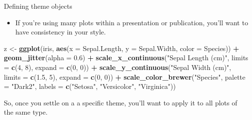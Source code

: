 \documentclass[
  ignorenonframetext,
]{beamer}
\newenvironment{Shaded}{\begin{snugshade}}{\end{snugshade}}
\newcommand{\AttributeTok}[1]{\textcolor[rgb]{0.13,0.29,0.53}{#1}}
\newcommand{\DecValTok}[1]{\textcolor[rgb]{0.00,0.00,0.81}{#1}}
\newcommand{\FloatTok}[1]{\textcolor[rgb]{0.00,0.00,0.81}{#1}}
\newcommand{\FunctionTok}[1]{\textcolor[rgb]{0.13,0.29,0.53}{\textbf{#1}}}
\newcommand{\NormalTok}[1]{#1}
\newcommand{\OtherTok}[1]{\textcolor[rgb]{0.56,0.35,0.01}{#1}}
\newcommand{\SpecialCharTok}[1]{\textcolor[rgb]{0.81,0.36,0.00}{\textbf{#1}}}
\newcommand{\StringTok}[1]{\textcolor[rgb]{0.31,0.60,0.02}{#1}}
\providecommand{\tightlist}{%
  \setlength{\itemsep}{0pt}\setlength{\parskip}{0pt}}
\begin{document}
\begin{frame}[fragile]{Defining theme objects}
\label{defining-theme-objects}
\begin{itemize}
\tightlist
\item
  If you're using many plots within a presentation or publication,
  you'll want to have consistency in your style.
\end{itemize}


\begin{Shaded}
\begin{Highlighting}[]
\NormalTok{z }\OtherTok{\textless{}{-}} \FunctionTok{ggplot}\NormalTok{(iris, }\FunctionTok{aes}\NormalTok{(}\AttributeTok{x =}\NormalTok{ Sepal.Length, }\AttributeTok{y =}\NormalTok{ Sepal.Width, }\AttributeTok{color =}\NormalTok{ Species)) }\SpecialCharTok{+}
    \FunctionTok{geom\_jitter}\NormalTok{(}\AttributeTok{alpha =} \FloatTok{0.6}\NormalTok{) }\SpecialCharTok{+} \FunctionTok{scale\_x\_continuous}\NormalTok{(}\StringTok{"Sepal Length (cm)"}\NormalTok{,}
    \AttributeTok{limits =} \FunctionTok{c}\NormalTok{(}\DecValTok{4}\NormalTok{, }\DecValTok{8}\NormalTok{), }\AttributeTok{expand =} \FunctionTok{c}\NormalTok{(}\DecValTok{0}\NormalTok{, }\DecValTok{0}\NormalTok{)) }\SpecialCharTok{+} \FunctionTok{scale\_y\_continuous}\NormalTok{(}\StringTok{"Sepal Width (cm)"}\NormalTok{,}
    \AttributeTok{limits =} \FunctionTok{c}\NormalTok{(}\FloatTok{1.5}\NormalTok{, }\DecValTok{5}\NormalTok{), }\AttributeTok{expand =} \FunctionTok{c}\NormalTok{(}\DecValTok{0}\NormalTok{, }\DecValTok{0}\NormalTok{)) }\SpecialCharTok{+} \FunctionTok{scale\_color\_brewer}\NormalTok{(}\StringTok{"Species"}\NormalTok{,}
    \AttributeTok{palette =} \StringTok{"Dark2"}\NormalTok{, }\AttributeTok{labels =} \FunctionTok{c}\NormalTok{(}\StringTok{"Setosa"}\NormalTok{, }\StringTok{"Versicolor"}\NormalTok{, }\StringTok{"Virginica"}\NormalTok{))}
\end{Highlighting}
\end{Shaded}

So, once you settle on a a specific theme, you'll want to apply it to
all plots of the same type.
\end{frame}
\end{document}
